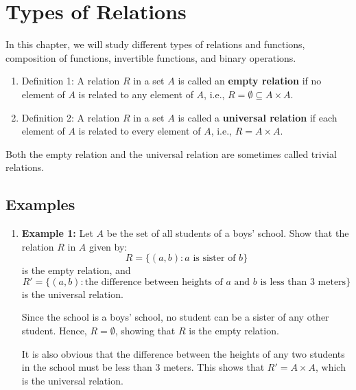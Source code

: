                                                                                \section{Types of Relations}                                                   In this chapter, we will study different types of relations and functions, composition of functions, invertible functions, and binary operations.                                                                                            \begin{enumerate}                                                                  \item Definition 1: A relation \( R \) in a set \( A \) is called an \textbf{empty relation} if no element of \( A \) is related to any element of \( A \), i.e., \( R = \emptyset \subseteq A \times A \).                                  \item Definition 2: A relation \( R \) in a set \( A \) is called a \textbf{universal relation} if each element of \( A \) is related to every element of \( A \), i.e., \( R = A \times A \).                                           \end{enumerate}                                                                                                                                               Both the empty relation and the universal relation are sometimes called trivial relations.

\subsection{Examples}                                                          \begin{enumerate}
    \item \textbf{Example 1:} Let \( A \) be the set of all students of a boys' school. Show that the relation \( R \) in \( A \) given by:
    \[
    R = \{(a, b) : a \text{ is sister of } b\}
    \]
    is the empty relation, and
    \[
    R' = \{(a, b) : \text{the difference between heights of } a \text{ and } b \text{ is less than 3 meters}\}
    \]
    is the universal relation.

    \solution Since the school is a boys' school, no student can be a sister of any other student. Hence, \( R = \emptyset \), showing that \( R \) is the empty relation.

    It is also obvious that the difference between the heights of any two students in the school must be less than 3 meters. This shows that \( R' = A \times A \), which is the universal relation.
\end{enumerate}

